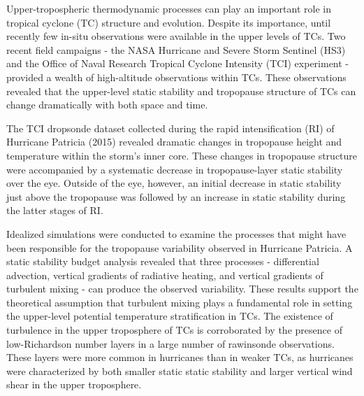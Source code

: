  


\indent \indent Upper-tropospheric thermodynamic processes can play an important role in tropical cyclone (TC) structure and evolution.
Despite its importance, until recently few in-situ observations were available in the upper levels of TCs.
Two recent field campaigns - the NASA Hurricane and Severe Storm Sentinel (HS3) and the Office of Naval Research Tropical Cyclone Intensity (TCI) experiment - provided a wealth of high-altitude observations within TCs.
These observations revealed that the upper-level static stability and tropopause structure of TCs can change dramatically with both space and time.

The TCI dropsonde dataset collected during the rapid intensification (RI) of Hurricane Patricia (2015) revealed dramatic changes in tropopause height and temperature within the storm's inner core.
These changes in tropopause structure were accompanied by a systematic decrease in tropopause-layer static stability over the eye.
Outside of the eye, however, an initial decrease in static stability just above the tropopause was followed by an increase in static stability during the latter stages of RI.

Idealized simulations were conducted to examine the processes that might have been responsible for the tropopause variability observed in Hurricane Patricia.
A static stability budget analysis revealed that three processes - differential advection, vertical gradients of radiative heating, and vertical gradients of turbulent mixing - can produce the observed variability.
These results support the theoretical assumption that turbulent mixing plays a fundamental role in setting the upper-level potential temperature stratification in TCs.
The existence of turbulence in the upper troposphere of TCs is corroborated by the presence of low-Richardson number layers in a large number of rawinsonde observations.
These layers were more common in hurricanes than in weaker TCs, as hurricanes were characterized by both smaller static static stability and larger vertical wind shear in the upper troposphere.

